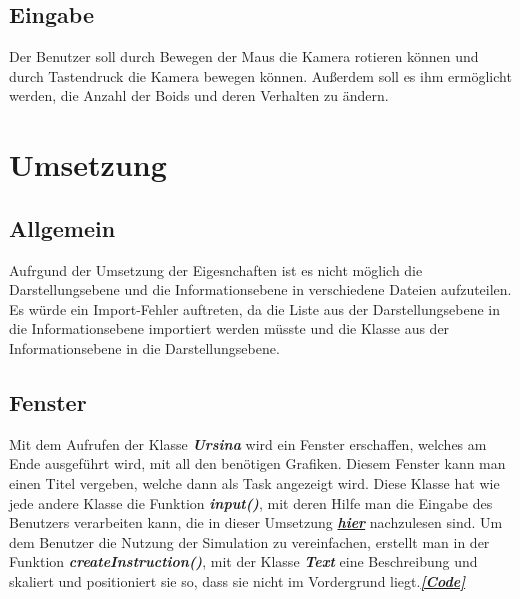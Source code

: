 \documentclass[a4paper, hidelinks, 12pt]{article}
\begin{document}
\subsection{Eingabe}
Der Benutzer soll durch Bewegen der Maus die Kamera rotieren können und durch Tastendruck die Kamera bewegen können. Außerdem soll es ihm ermöglicht werden, die Anzahl der Boids und deren Verhalten zu ändern.
\newpage
	
	
	
\section{Umsetzung}
\subsection{Allgemein}
Aufrgund der Umsetzung der Eigesnchaften ist es nicht möglich die Darstellungsebene und die Informationsebene in verschiedene Dateien aufzuteilen. Es würde ein Import-Fehler auftreten, da die Liste aus der Darstellungsebene in die Informationsebene importiert werden müsste und die Klasse aus der Informationsebene in die Darstellungsebene.
	
\subsection{Fenster}\label{sec:Fenster}
Mit dem Aufrufen der Klasse \textbf{\emph{Ursina}}\cite{2022m} wird ein Fenster erschaffen, welches am Ende ausgeführt wird, mit all den benötigen Grafiken\cite{2022q}. Diesem Fenster kann man einen Titel vergeben, welche dann als Task angezeigt wird\cite{2022q}. Diese Klasse hat wie jede andere Klasse\cite{2022} die Funktion \textbf{\emph{input()}}, mit deren Hilfe man die Eingabe des Benutzers verarbeiten kann, die in dieser Umsetzung \hyperref[sec:input]{\textbf{\emph{hier}}} nachzulesen sind. Um dem Benutzer die Nutzung der Simulation zu vereinfachen, erstellt man in der Funktion \textbf{\emph{createInstruction()}}, mit der Klasse \textbf{\emph{Text}} eine Beschreibung und skaliert und positioniert sie so, dass sie nicht im Vordergrund liegt\cite{text}.\hyperref[CodeFenster]{\textbf{\emph{[Code]}}}
\end{document}
